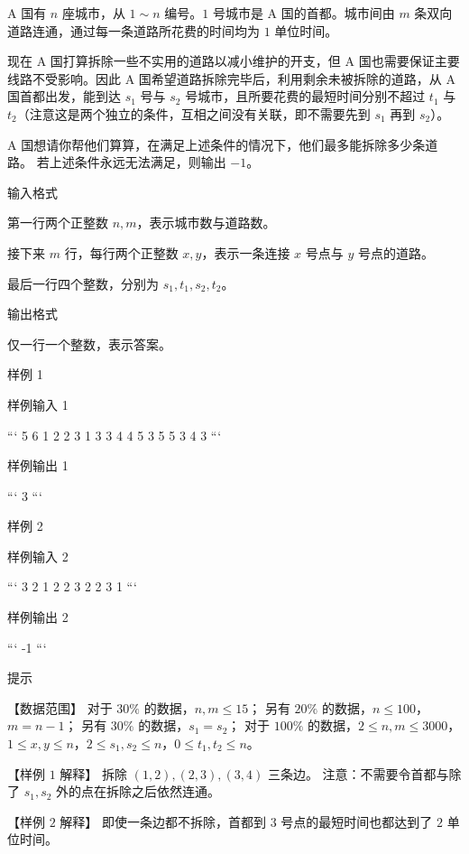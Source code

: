\documentclass[12pt,twiside,a4paper]{ctexbook}
\numberwithin{chapter}{part}
\begin{document}
A 国有 $n$ 座城市，从 $1 \sim n$ 编号。$1$ 号城市是 A 国的首都。城市间由 $m$ 条双向道路连通，通过每一条道路所花费的时间均为 $1$ 单位时间。  

现在 A 国打算拆除一些不实用的道路以减小维护的开支，但 A 国也需要保证主要线路不受影响。因此 A 国希望道路拆除完毕后，利用剩余未被拆除的道路，从 A 国首都出发，能到达 $s_1$ 号与 $s_2$ 号城市，且所要花费的最短时间分别不超过 $t_1$ 与 $t_2$（注意这是两个独立的条件，互相之间没有关联，即不需要先到 $s_1$ 再到 $s_2$）。

A 国想请你帮他们算算，在满足上述条件的情况下，他们最多能拆除多少条道路。 若上述条件永远无法满足，则输出 $-1$。

 输入格式

第一行两个正整数 $n,m$，表示城市数与道路数。  

接下来 $m$ 行，每行两个正整数 $x,y$，表示一条连接 $x$ 号点与 $y$ 号点的道路。

最后一行四个整数，分别为 $s_1,t_1,s_2,t_2$。

 输出格式

仅一行一个整数，表示答案。

 样例 1

 样例输入 1

```
5 6
1 2
2 3
1 3
3 4
4 5
3 5
5 3 4 3
```

 样例输出 1

```
3
```

 样例 2

 样例输入 2

```
3 2
1 2
2 3
2 2 3 1
```

 样例输出 2

```
-1
```

 提示

【数据范围】  
对于 $30\%$ 的数据，$n,m \le 15$；   
另有 $20\%$ 的数据，$n \le 100$，$m = n-1$；   
另有 $30\%$ 的数据，$s_1 = s_2$；  
对于 $100\%$ 的数据，$2 \le n,m \le 3000$，$1\le x,y \le n$，$2 \le s_1,s_2 \le n$，$0 \le t_1,t_2 \le n$。  

【样例 $1$ 解释】  
拆除 $(1,2),(2,3),(3,4)$ 三条边。  
注意：不需要令首都与除了 $s_1,s_2$ 外的点在拆除之后依然连通。

【样例 $2$ 解释】  
即使一条边都不拆除，首都到 $3$ 号点的最短时间也都达到了 $2$ 单位时间。
\end{document}
